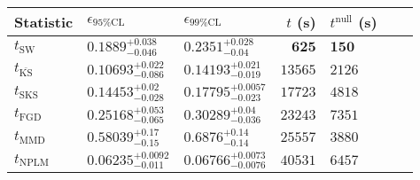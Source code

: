 \begin{tabular}{l|llr|llr}
Statistic & $\epsilon_{95\%\mathrm{CL}}$ & $\epsilon_{99\%\mathrm{CL}}$ & $t$ (s) & $t^{\mathrm{null}}$ (s) \\
	\midrule
	$t_{\mathrm{SW}}$ & $0.1889_{-0.046}^{+0.038}$ & $0.2351_{-0.04}^{+0.028}$ & ${\mathbf{625}}$ & ${\mathbf{150}}$ \\
	$t_{\overline{\mathrm{KS}}}$ & ${\mathbf{0.10693_{-0.086}^{+0.022}}}$ & ${\mathbf{0.14193_{-0.019}^{+0.021}}}$ & $13565$ & $2126$ \\
	$t_{\mathrm{SKS}}$ & $0.14453_{-0.028}^{+0.02}$ & $0.17795_{-0.023}^{+0.0057}$ & $17723$ & $4818$ \\
	$t_{\mathrm{FGD}}$ & $0.25168_{-0.065}^{+0.053}$ & $0.30289_{-0.036}^{+0.04}$ & $23243$ & $7351$ \\
	$t_{\mathrm{MMD}}$ & $0.58039_{-0.15}^{+0.17}$ & $0.6876_{-0.14}^{+0.14}$ & $25557$ & $3880$ \\
\rowcolor{red!35}	$t_{\mathrm{NPLM}}$ & $0.06235_{-0.011}^{+0.0092}$ & $0.06766_{-0.0076}^{+0.0073}$ & $40531$ & $6457$ \\
	\bottomrule
\end{tabular}